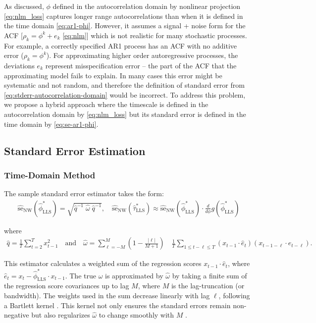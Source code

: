 \documentclass[docs/main.tex]{subfiles}
\begin{document}
As discussed, $\phi$ defined in the autocorrelation domain by nonlinear projection \eqref{eq:nlm_loss} captures longer range autocorrelations than when it is defined in the time domain \eqref{eq:ar1-phi}. However, it assumes a signal + noise form for the ACF [$\rho_k = \phi^k + e_k$ \eqref{eq:nlm}] which is not realistic for many stochastic processes. For example, a correctly specified AR1 process has an ACF with no additive error ($\rho_k=\phi^k$). For approximating higher order autoregressive processes, the deviations $e_k$ represent misspecification error -- the part of the ACF that the approximating model fails to explain. In many cases this error might be systematic and not random, and therefore the definition of standard error from \eqref{eq:stderr-autocorrelation-domain} would be incorrect. To address this problem, we propose a hybrid approach where the timescale is defined in the autocorrelation domain by \eqref{eq:nlm_loss} but its standard error is defined in the time domain by \eqref{eq:se-ar1-phi}.

\subsection{Standard Error Estimation}
\subsubsection{Time-Domain Method}\label{sec:stderr-time-domain_}
The sample standard error estimator takes the form:
\begin{align}\label{eq:stderr-time-domain_}
\widehat{\text{se}}_{\text{NW}}(\hat\phi^*_{\scriptscriptstyle\text{LLS}}) = \sqrt{\hat q^{-1}\;\hat\omega\; \hat q^{-1}}, \quad
\widehat{\text{se}}_{\text{NW}}(\hat\tau^*_{\scriptscriptstyle\text{LLS}}) \approx \widehat{\text{se}}_{\text{NW}}(\hat\phi^*_{\scriptscriptstyle\text{LLS}}) \cdot \frac{d}{d\phi} g(\hat\phi^*_{\scriptscriptstyle\text{LLS}})
\end{align}

\noindent where
\begin{align}\label{eq:lls_q_omega_}
    \hat q = \frac{1}{T} \sum_{t=2}^T x_{t-1}^2 \quad\text{and}\quad
    \hat \omega = \sum_{\ell=-M}^M \left(1 - \frac{|\ell|}{M+1}\right) \quad \frac{1}{T} \sum_{1\le t - \ell \le T} (x_{t-1} \cdot \hat e_t)(x_{t-1-\ell} \cdot \hat e_{t-\ell}).
\end{align}

\noindent This estimator calculates a weighted sum of the regression scores $x_{t-1} \cdot \hat e_t$, where $\hat e_t = x_t - \hat\phi^*_{\scriptscriptstyle\text{LLS}} \cdot x_{t-1}$. The true $\omega$ is approximated by $\hat \omega$ by taking a finite sum of the regression score covariances up to lag $M$, where $M$ is the lag-truncation (or bandwidth). The weights used in the sum decrease linearly with lag $\ell$, following a Bartlett kernel \citep{newey_simple_1987}. This kernel not only ensures the standard errors remain non-negative but also regularizes $\hat \omega$ to change smoothly with $M$ \citep[Chapter~14.35]{hansen_econometrics_2022}.\\
\end{document}
